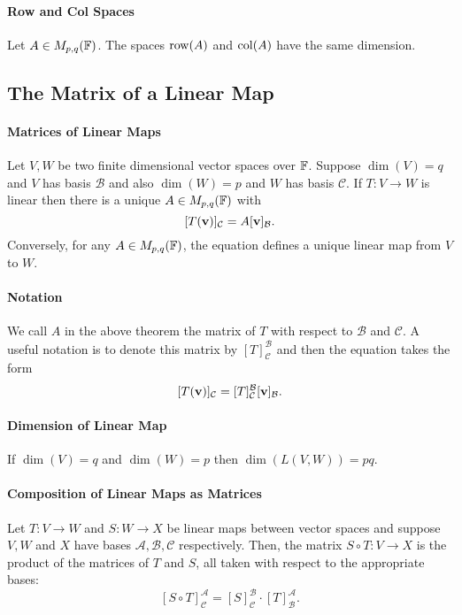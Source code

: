 \paragraph{Row and Col Spaces}
Let \(A \in M_{p,q}(\mathbb{F})\). The spaces \(\mathrm{row}(A)\) and \(\mathrm{col}(A)\) have the same dimension.

\subsection{The Matrix of a Linear Map}
\paragraph{Matrices of Linear Maps}
Let \(V,W\) be two finite dimensional vector spaces over \(\mathbb{F}\). Suppose \(\dim(V) = q\) and \(V\) has basis \(\mathcal{B}\) and also \(\dim(W) = p\) and \(W\) has basis \(\mathcal{C}\). If \(T: V \to W\) is linear then there is a unique \(A \in M_{p,q}(\mathbb{F})\) with
\[[T(\mathbf{v})]_\mathcal{C} = A[\mathbf{v}]_\mathcal{B}.\]
Conversely, for any \(A \in M_{p,q}(\mathbb{F})\), the equation defines a unique linear map from \(V\) to \(W\).

\paragraph{Notation}
We call \(A\) in the above theorem the matrix of \(T\) with respect to \(\mathcal{B}\) and \(\mathcal{C}\). A useful notation is to denote this matrix by \([T]_\mathcal{C}^\mathcal{B}\) and then the equation takes the form
\[[T(\mathbf{v})]_\mathcal{C} = [T]_\mathcal{C}^\mathcal{B}[\mathbf{v}]_\mathcal{B}.\]

\paragraph{Dimension of Linear Map}
If \(\dim(V) = q\) and \(\dim(W) = p\) then \(\dim(L(V,W)) = pq\).

\paragraph{Composition of Linear Maps as Matrices}
Let \(T: V \to W\) and \(S: W \to X\) be linear maps between vector spaces and suppose \(V, W\) and \(X\) have bases \(\mathcal{A}, \mathcal{B}, \mathcal{C}\) respectively. Then, the matrix \(S \circ T : V \to X\) is the product of the matrices of \(T\) and \(S\), all taken with respect to the appropriate bases:
\[ [S \circ T]_\mathcal{C}^\mathcal{A} = [S]_\mathcal{C}^\mathcal{B} \cdot [T]_\mathcal{B}^\mathcal{A}.\]

